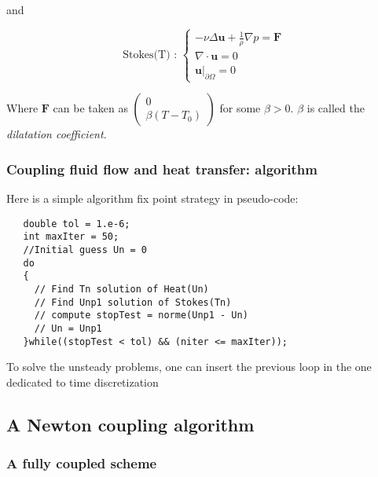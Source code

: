   and

  $$\mbox{Stokes(T) : }\left\{
    \begin{array}{rcc}
      -\nu\Delta\mathbf{u} +
      \frac{1}{\rho}\nabla p =
      \mathbf{F}\\
      \nabla\cdot\mathbf{u} = 0\\
      \mathbf{u}|_{\partial \Omega} = 0
    \end{array}
  \right.
  $$

Where $\mathbf{F}$ can be taken as $
 \left(
  \begin{array}{c}
    0 \\
    \beta(T-T_0)
  \end{array}
\right)
$
for some $\beta > 0$. $\beta$ is called the \emph{dilatation coefficient}.

\subsubsection{Coupling fluid flow and heat transfer: algorithm}
Here is a simple algorithm fix point strategy in pseudo-code:
\begin{lstlisting}
   double tol = 1.e-6;
   int maxIter = 50;
   //Initial guess Un = 0
   do
   {
     // Find Tn solution of Heat(Un)
     // Find Unp1 solution of Stokes(Tn)
     // compute stopTest = norme(Unp1 - Un)
     // Un = Unp1
   }while((stopTest < tol) && (niter <= maxIter));
\end{lstlisting}

\begin{remark}
  To solve the unsteady problems, one can insert the previous loop in
  the one dedicated to time discretization
\end{remark}

\subsection{A Newton coupling algorithm}
\label{sec:newt-coupl-algor}

\subsubsection{A fully coupled scheme}

